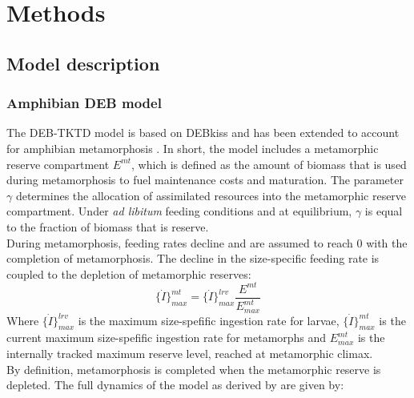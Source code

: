 \section{Methods}

\subsection{Model description}

\subsubsection{Amphibian DEB model}
%
The DEB-TKTD model is based on DEBkiss \citep{jagerDEBkissQuestSimplest2013} 
and has been extended to account for amphibian metamorphosis \citep{hansulDynamicModellingAmphibian}. 
In short, the model includes a metamorphic reserve compartment $E^{mt}$, 
which is defined as the amount of biomass that is used during metamorphosis to fuel 
maintenance costs and maturation. 
The parameter $\gamma$ determines the allocation of assimilated resources into the metamorphic reserve 
compartment. 
Under \textit{ad libitum} feeding conditions and at equilibrium, 
$\gamma$ is equal to the fraction of biomass that is reserve.\\
During metamorphosis, feeding rates decline and are assumed to reach 0 with the completion of metamorphosis. 
The decline in the size-specific feeding rate is coupled to the depletion of metamorphic reserves:
%
\begin{equation}
    \{ \dot{I} \}_{max}^{mt} = \{ \dot{I} \}_{max}^{lrv} \dfrac{E^{mt}}{E^{mt}_{max}}  
    \label{eq:dI_mt}
\end{equation}
%
Where  $\{ \dot{I} \}_{max}^{lrv}$ is the maximum size-spefific ingestion rate for larvae,
$\{ \dot{I} \}_{max}^{mt}$ is the current maximum size-spefific ingestion rate for metamorphs 
and $E^{mt}_{max}$ is the internally tracked maximum reserve level, 
reached at metamorphic climax.\\
By definition, metamorphosis is completed when the metamorphic reserve is depleted. 
The full dynamics of the model as derived by \citet{hansulDynamicModellingAmphibian} are given by:
